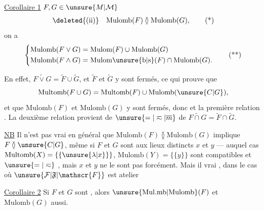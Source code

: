 \uline{Corollaire 1}  $F,G\in\unsure{M|\mathcal M}$  
\[
 \deleted{\text{(ii)}}\quad \mathrm{Mulomb}(F)\between\mathrm{Mulomb}(G),
 \tag*{(*)}
\]
 on a
\[
 \left\{\begin{aligned}
  \mathrm{Mulomb}(F\vee G)&=\mathrm{Mulom}(F)\cup\mathrm{Mulomb}(G)\\
  \mathrm{Mulomb}(F\wedge G)&=\mathrm{Mulom\unsure{b|s}}(F)\cap\mathrm{Mulomb}(G).
 \end{aligned}\right.
 \tag*{(**)}
\]



En effet, $\widetilde{F\vee G}=\widetilde F\cup\widetilde G$, et $\widetilde F$ et $\widetilde G$ y sont fermés,  ce qui prouve que
\[
 \mathrm{Multomb}(F\cup G)=\mathrm{Multomb}(F)\cup\mathrm{Mulomb}(\unsure{C|G}),
\]
et que $\mathrm{Mulomb}(F)$ et $\mathrm{Mulomb}(G)$ y sont fermés, donc \unsure{(*)} et la première relation \unsure{(**)|($\ll$)}. La deuxième relation \inserted{\unsure{(**)|($\ll$)}} provient de $\unsure{=|\eqsim|\overline{m}}$ de $\widetilde{F\cap G}=\widetilde F\cap\widetilde G$.

\uline{NB} Il n'est pas vrai en général que $\mathrm{Mulomb}(F)\between\mathrm{Mulomb}(G)$ implique $F\between\unsure{C|G}$, même si $F$ et $G$ sont  aux lieux distincts $x$ et $y$ --- auquel cas $\mathrm{Multomb}(X)=\{\{\unsure{\lambda|x}\}\}$, $\mathrm{Mulomb}(Y)=\{\{y\}\}$ sont compatibles et $\unsure{=|\eqsim}$ , mais $x$ et $y$ ne le sont pas forcément. Mais il  vrai , dans le cas où $\unsure{\mathcal{F}|\mathfrak{F}|\mathscr{F}}$ est  atelier 

\uline{Corollaire 2} Si $F$ et $G$ sont , alors $\unsure{\mathrm{Mul.mb}|\mathrm{Mulomb}}(F)$ et $\mathrm{Mulomb}(G)$ aussi.

